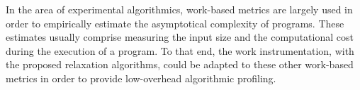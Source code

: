 In the area of experimental algorithmics, work-based metrics are largely used in order to empirically estimate the asymptotical complexity of programs.
These estimates usually comprise measuring the input size and the computational cost during the execution of a program.
To that end, the work instrumentation, with the proposed relaxation algorithms, could be adapted to these other work-based metrics in order to provide low-overhead algorithmic profiling.
